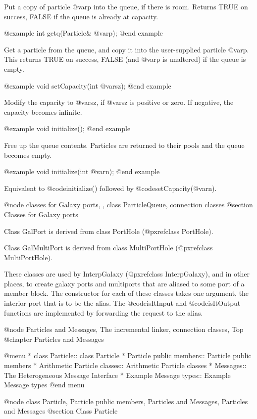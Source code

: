 Put a copy of particle @var{p} into the queue, if there is room.
Returns TRUE on success, FALSE if the queue is already at capacity.

@example
int getq(Particle& @var{p});
@end example

Get a particle from the queue, and copy it into the user-supplied
particle @var{p}.  This returns TRUE on success, FALSE (and @var{p}
is unaltered) if the queue is empty.

@example
void setCapacity(int @var{sz});
@end example

Modify the capacity to @var{sz}, if @var{sz} is positive or zero.  If
negative, the capacity becomes infinite.

@example
void initialize();
@end example

Free up the queue contents.  Particles are returned to their pools and
the queue becomes empty.

@example
void initialize(int @var{n});
@end example

Equivalent to @code{initialize()} followed by @code{setCapacity(@var{n})}.

@node classes for Galaxy ports,  , class ParticleQueue, connection classes
@section Classes for Galaxy ports

Class GalPort is derived from class PortHole (@pxref{class PortHole}).

Class GalMultiPort is derived from class MultiPortHole
(@pxref{class MultiPortHole}).

These classes are used by InterpGalaxy (@pxref{class InterpGalaxy}),
and in other places, to create
galaxy ports and multiports that are aliased to some port of a member
block.  The constructor for each of these classes takes one argument,
the interior port that is to be the alias.  The @code{isItInput} and
@code{isItOutput} functions are implemented by forwarding the request
to the alias.

@node Particles and Messages, The incremental linker, connection classes, Top
@chapter Particles and Messages

@menu
* class Particle::              class Particle
* Particle public members::     Particle public members
* Arithmetic Particle classes::  Arithmetic Particle classes
* Messages::                    The Heterogeneous Message Interface
* Example Message types::       Example Message types
@end menu

@node class Particle, Particle public members, Particles and Messages, Particles and Messages
@section Class Particle

